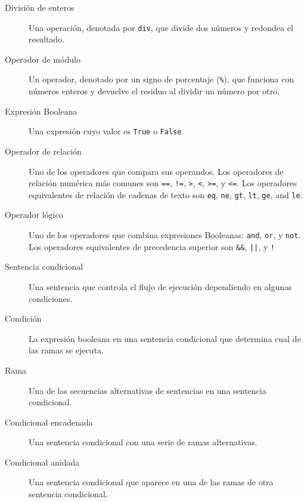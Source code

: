 \begin{description}

\item[División de enteros] Una operación, denotada por {\tt div},
que divide dos números y redondea el resultado.

\item[Operador de módulo]  Un operador, denotado por un signo
de porcentaje ({\tt \%}), que funciona con números enteros y devuelve
el residuo al dividir un número por otro.

\item[Expresión Booleana]  Una expresión cuyo valor es 
{\tt True} o {\tt False}.

\item[Operador de relación] Uno de los operadores que compara
sus operandos. Los operadores de relación numérica más comunes son 
{\tt ==}, {\tt !=}, {\tt >}, {\tt <}, {\tt >=}, y {\tt <=}. 
Los operadores equivalentes de relación de cadenas de texto 
son {\tt eq}, {\tt ne}, {\tt gt}, {\tt lt}, {\tt ge}, and {\tt le}.

\item[Operador lógico] Uno de los operadores que combina expresiones
Booleanas: {\tt and}, {\tt or}, y {\tt not}. Los 
operadores equivalentes de precedencia superior son
{\tt \&\&}, {\tt ||}, y {\tt !}

\item[Sentencia condicional]  Una sentencia que controla el flujo
de ejecución dependiendo en algunas condiciones.

\item[Condición] La expresión booleana en una sentencia
condicional que determina cual de las ramas se ejecuta.

\item[Rama] Una de las secuencias alternativas de sentencias
en una sentencia condicional.

\item[Condicional encadenada]  Una sentencia condicional con 
una serie de ramas alternativas.

\item[Condicional anidada]  Una sentencia condicional que aparece
en una de las ramas de otra sentencia condicional.


\end{description}
